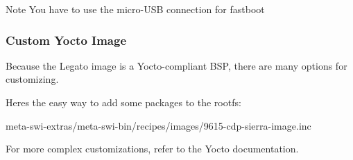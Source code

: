\begin{DoxyNote}{Note}
You have to use the micro-\/\+U\+S\+B connection for fastboot
\end{DoxyNote}
\hypertarget{yocto_legato_getstartedYoctoLinux_custYoctoImages}{}\subsubsection{Custom Yocto Image}\label{yocto_legato_getstartedYoctoLinux_custYoctoImages}
Because the Legato image is a Yocto-\/compliant B\+S\+P, there are many options for customizing.

Here\textquotesingle{}s the easy way to add some packages to the rootfs\+:


\begin{DoxyCode}
meta-swi-extras/meta-swi-bin/recipes/images/9615-cdp-sierra-image.inc 
\end{DoxyCode}


For more complex customizations, refer to the Yocto documentation.





